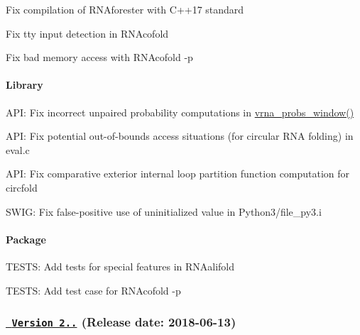 \begin{DoxyItemize}
\item Fix compilation of R\+N\+Aforester with C++17 standard
\item Fix tty input detection in R\+N\+Acofold
\item Fix bad memory access with R\+N\+Acofold -\/p
\end{DoxyItemize}

\paragraph*{Library}


\begin{DoxyItemize}
\item A\+PI\+: Fix incorrect unpaired probability computations in \mbox{\hyperlink{group__part__func__window_ga7115d012988541a65ec323c5f17a334b}{vrna\+\_\+probs\+\_\+window()}}
\item A\+PI\+: Fix potential out-\/of-\/bounds access situations (for circular R\+NA folding) in eval.\+c
\item A\+PI\+: Fix comparative exterior internal loop partition function computation for circfold
\item S\+W\+IG\+: Fix false-\/positive use of uninitialized value in Python3/file\+\_\+py3.\+i
\end{DoxyItemize}

\paragraph*{Package}


\begin{DoxyItemize}
\item T\+E\+S\+TS\+: Add tests for special features in R\+N\+Aalifold
\item T\+E\+S\+TS\+: Add test case for R\+N\+Acofold -\/p
\end{DoxyItemize}

\subsubsection*{\href{https://github.com/ViennaRNA/ViennaRNA/compare/v2.4.6...v2.4.7}{\texttt{ Version 2..}} (Release date\+: 2018-\/06-\/13)}



